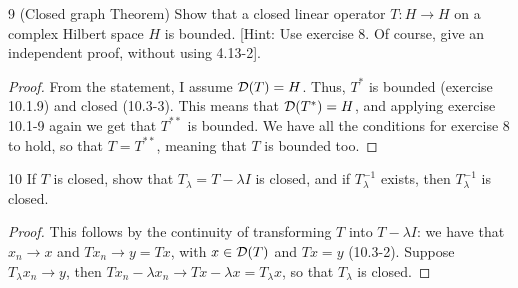 \begin{exercise}{9 (Closed graph Theorem)}
Show that a closed linear operator $T: H \to H$ on a complex Hilbert space $H$ is bounded.
[Hint: Use exercise 8.
Of course, give an independent proof, without using 4.13-2].
\end{exercise}
\begin{proof}
From the statement, I assume $\mathcal{D}(T) = H$.
Thus, $T^\ast$ is bounded (exercise 10.1.9) and closed (10.3-3).
This means that $\mathcal{D}(T^\ast) = H$, and applying exercise 10.1-9 again we get that $T^{\ast \ast}$ is bounded.
We have all the conditions for exercise 8 to hold, so that $T = T^{\ast \ast}$, meaning that $T$ is bounded too.
\end{proof} 

\begin{exercise}{10}
If $T$ is closed, show that $T_\lambda = T - \lambda I$ is closed, and if $T_\lambda^{-1}$ exists, then $T_\lambda^{-1}$ is closed.
\end{exercise}
\begin{proof}
This follows by the continuity of transforming $T$ into $T - \lambda I$:
we have that $x_n \to x$ and $Tx_n \to y = Tx$, with $x \in \mathcal{D}(T)$ and $Tx = y$ (10.3-2).
Suppose $T_\lambda x_n \to y$, then $T x_n - \lambda x_n \to Tx - \lambda x = T_\lambda x$, so that $T_\lambda$ is closed.

\end{proof} 
